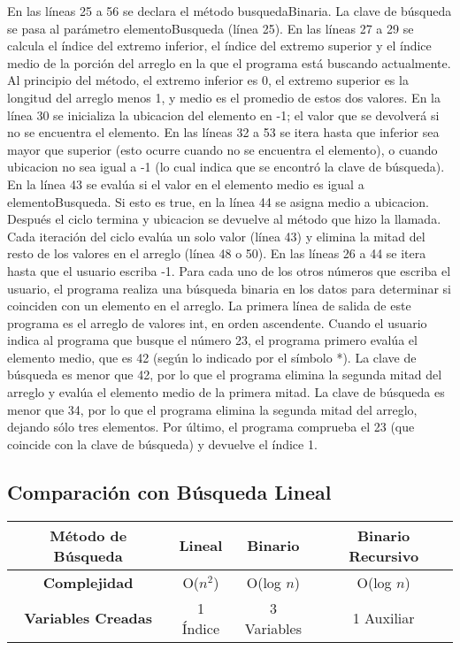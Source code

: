 En las líneas 25 a 56 se declara el método busquedaBinaria. La clave de búsqueda se pasa al parámetro elementoBusqueda (línea 25). En las líneas 27 a 29 se calcula el índice del extremo inferior, el índice del extremo superior y el índice medio de la porción del arreglo en la que el programa está buscando actualmente. Al principio del método, el extremo inferior es 0, el extremo superior es la longitud del arreglo menos 1, y medio es el promedio de estos dos valores. En la línea 30 se inicializa la ubicacion del elemento en -1; el valor que se devolverá si no se encuentra el elemento. En las líneas 32 a 53 se itera hasta que inferior sea mayor que superior (esto ocurre cuando no se encuentra el elemento), o cuando ubicacion no sea igual a -1 (lo cual indica que se encontró la clave de búsqueda). En la línea 43 se evalúa si el valor en el elemento medio es igual a elementoBusqueda. Si esto es true, en la línea 44 se asigna medio a ubicacion. Después el ciclo termina y ubicacion se devuelve al método que hizo la llamada. Cada iteración del ciclo evalúa un solo valor (línea 43) y elimina la mitad del resto de los valores en el arreglo (línea 48 o 50). En las líneas 26 a 44 se itera hasta que el usuario escriba -1. Para cada uno de los otros números que escriba el usuario, el programa realiza una búsqueda binaria en los datos para determinar si coinciden con un elemento en el arreglo. La primera línea de salida de este programa es el arreglo de valores int, en orden ascendente. Cuando el usuario indica al programa que busque el número 23, el programa primero evalúa el elemento medio, que es 42 (según lo indicado por el símbolo *). La clave de búsqueda es menor que 42, por lo que el programa elimina la segunda mitad del arreglo y evalúa el elemento medio de la primera mitad. La clave de búsqueda es menor que 34, por lo que el programa elimina la segunda mitad del arreglo, dejando sólo tres elementos. Por último, el programa comprueba el 23 (que coincide con la clave de búsqueda) y devuelve el índice 1.


\subsection{Comparación con Búsqueda Lineal}


\begin{center}
\begin{tabular}{|c|c|c|c|}
\hline
\cellcolor[gray]{0.85} \textbf{Método de Búsqueda} & 	\cellcolor[gray]{0.85} \textbf{Lineal} 		& 	\cellcolor[gray]{0.85} \textbf{Binario}	& \cellcolor[gray]{0.85}\textbf{Binario Recursivo}\\

\hline
\cellcolor[gray]{0.85}\textbf{Complejidad} & O($n^\mathrm{2}$) & O(log $n$) & O(log $n$)\\
\hline
\cellcolor[gray]{0.85}\textbf{Variables Creadas} & 1 Índice & 3 Variables & 1 Auxiliar\\
\hline
\end{tabular}
\end{center}


